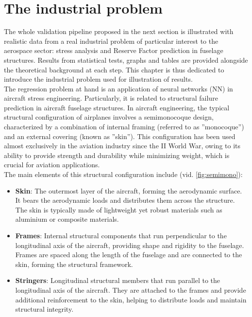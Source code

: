 \chapter{The industrial problem}\label{chap:2}
The whole validation pipeline proposed in the next section is illustrated with realistic data from a real industrial problem of particular interest to the aerospace sector: stress analysis and Reserve Factor prediction in fuselage structures. Results from statistical tests, graphs and tables are provided alongside the theoretical background at each step. This chapter is thus dedicated to introduce the industrial problem used for illustration of results.\\
%
\indent The regression problem at hand is an application of neural networks (NN) in aircraft stress engineering. Particularly, it is related to structural failure prediction in aircraft fuselage structures. In aircraft engineering, the typical structural configuration of airplanes involves a semimonocoque design, characterized by a combination of internal framing (referred to as ''monocoque'') and an external covering (known as ''skin''). This configuration has been used almost exclusively in the aviation industry since the II World War, owing to its ability to provide strength and durability while minimizing weight, which is crucial for aviation applications.\\
%
\indent The main elements of this structural configuration include (vid. \autoref{fig:semimono}):
\begin{itemize}
\item \textbf{Skin}: The outermost layer of the aircraft, forming the aerodynamic surface. It bears the aerodynamic loads and distributes them across the structure. The skin is typically made of lightweight yet robust materials such as aluminium or composite materials.
\item \textbf{Frames}: Internal structural components that run perpendicular to the longitudinal axis of the aircraft, providing shape and rigidity to the fuselage. Frames are spaced along the length of the fuselage and are connected to the skin, forming the structural framework.
\item \textbf{Stringers}: Longitudinal structural members that run parallel to the longitudinal axis of the aircraft. They are attached to the frames and provide additional reinforcement to the skin, helping to distribute loads and maintain structural integrity.
\end{itemize}

